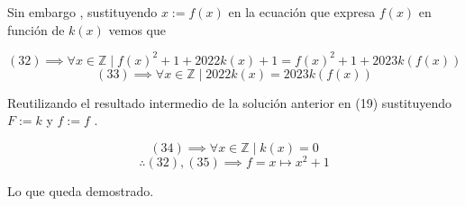 \documentclass[12pt]{article}
\begin{document}
Sin embargo , sustituyendo $x := f(x)$ en la ecuación que expresa $f(x)$ en función de $k(x)$ vemos que

\begin{equation}
	(32) \implies \forall x \in \mathbb{Z} \mid f(x)^2 + 1 + 2022 k(x) + 1 = f(x)^2 + 1 + 2023 k(f(x))
\end{equation}
\begin{equation}
	(33) \implies \forall x \in \mathbb{Z} \mid 2022 k(x) = 2023 k(f(x))
\end{equation}

Reutilizando el resultado intermedio de la solución anterior en (19) sustituyendo $F := k$ y $f := f$ .

\begin{equation}
	(34) \implies \forall x \in \mathbb{Z} \mid k(x) = 0
\end{equation}
\begin{equation}
	\therefore  (32), (35) \implies f = x \mapsto x^2 + 1
\end{equation}

\vspace{1cm}
Lo que queda demostrado. \\\\\\
\end{document}
